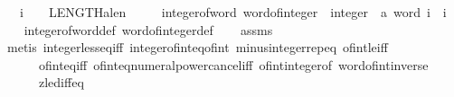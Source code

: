 \begin{isabellebody}
\ \ \ {\isachardoublequoteopen}i\ {\isasymle}\ {}\ {\isacharcircum}{\kern0pt}\ LENGTH{\isacharparenleft}{\kern0pt}{\isacharprime}{\kern0pt}a{\isacharcolon}{\kern0pt}{\isacharcolon}{\kern0pt}len{\isacharparenright}{\kern0pt}\ {\isacharminus}{\kern0pt}\ {}{\isachardoublequoteclose}\isanewline
\ \ \ {\isachardoublequoteopen}integer{\isacharunderscore}{\kern0pt}of{\isacharunderscore}{\kern0pt}word\ {\isacharparenleft}{\kern0pt}{\isacharparenleft}{\kern0pt}word{\isacharunderscore}{\kern0pt}of{\isacharunderscore}{\kern0pt}integer\ {\isacharcolon}{\kern0pt}{\isacharcolon}{\kern0pt}\ integer\ {\isasymRightarrow}\ {\isacharprime}{\kern0pt}a\ word{\isacharparenright}{\kern0pt}\ i{\isacharparenright}{\kern0pt}\ {\isacharequal}{\kern0pt}\ i{\isachardoublequoteclose}\isanewline
%
\isadelimproof
\ \ %
\endisadelimproof
%
\isatagproof
{}\isamarkupfalse%
\ integer{\isacharunderscore}{\kern0pt}of{\isacharunderscore}{\kern0pt}word{\isacharunderscore}{\kern0pt}def\ word{\isacharunderscore}{\kern0pt}of{\isacharunderscore}{\kern0pt}integer{\isacharunderscore}{\kern0pt}def\isanewline
\ \ \isamarkupfalse%
\ assms\ \isanewline
\ \ \isamarkupfalse%
\ {\isacharparenleft}{\kern0pt}metis\ integer{\isacharunderscore}{\kern0pt}less{\isacharunderscore}{\kern0pt}eq{\isacharunderscore}{\kern0pt}iff\ integer{\isacharunderscore}{\kern0pt}of{\isacharunderscore}{\kern0pt}int{\isacharunderscore}{\kern0pt}eq{\isacharunderscore}{\kern0pt}of{\isacharunderscore}{\kern0pt}int\ minus{\isacharunderscore}{\kern0pt}integer{\isachardot}{\kern0pt}rep{\isacharunderscore}{\kern0pt}eq\ of{\isacharunderscore}{\kern0pt}int{\isacharunderscore}{\kern0pt}{}{\isacharunderscore}{\kern0pt}le{\isacharunderscore}{\kern0pt}iff\ \isanewline
\ \ \ \ \ \ of{\isacharunderscore}{\kern0pt}int{\isacharunderscore}{\kern0pt}eq{\isacharunderscore}{\kern0pt}{}{\isacharunderscore}{\kern0pt}iff\ of{\isacharunderscore}{\kern0pt}int{\isacharunderscore}{\kern0pt}eq{\isacharunderscore}{\kern0pt}numeral{\isacharunderscore}{\kern0pt}power{\isacharunderscore}{\kern0pt}cancel{\isacharunderscore}{\kern0pt}iff\ of{\isacharunderscore}{\kern0pt}int{\isacharunderscore}{\kern0pt}integer{\isacharunderscore}{\kern0pt}of\ word{\isacharunderscore}{\kern0pt}of{\isacharunderscore}{\kern0pt}int{\isacharunderscore}{\kern0pt}inverse\ \isanewline
\ \ \ \ \ \ zle{\isacharunderscore}{\kern0pt}diff{}{\isacharunderscore}{\kern0pt}eq{\isacharparenright}{\kern0pt}%
\endisatagproof
{\isafoldproof}%
%
\isadelimproof

\end{isabellebody}
